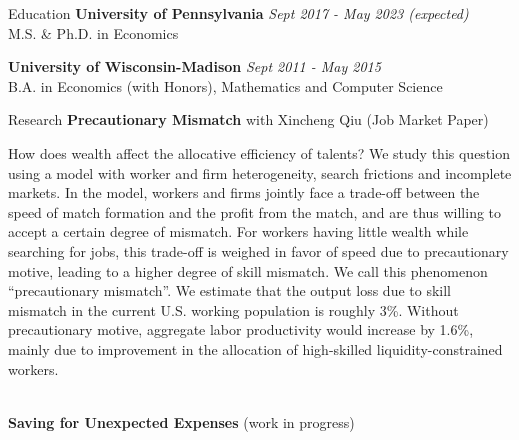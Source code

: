 \documentclass{resume}
\begin{document}
\begin{rSection}{Education}
{\bf University of Pennsylvania} \hfill {\em Sept 2017 - May 2023 (expected)}
\\M.S. \& Ph.D. in Economics 

{\bf University of Wisconsin-Madison} \hfill {\em Sept 2011 - May 2015} 
\\B.A. in Economics (with Honors), Mathematics and Computer Science

\end{rSection}

\begin{rSection}{Research}
\textbf{Precautionary Mismatch} with Xincheng Qiu (Job Market Paper)  \\
\begin{small}
How does wealth affect the allocative efficiency of talents? We study this question using a model with worker and firm heterogeneity, search frictions and incomplete markets. In the model, workers and firms jointly face a trade-off between the speed of match formation and the profit from the match, and are thus willing to accept a certain degree of mismatch. For workers having little wealth while searching for jobs, this trade-off is weighed in favor of speed due to precautionary motive, leading to a higher degree of skill mismatch. We call this phenomenon ``precautionary mismatch''. We estimate that the output loss due to skill mismatch in the current U.S. working population is roughly 3\%. Without precautionary motive, aggregate labor productivity would increase by 1.6\%, mainly due to improvement in the allocation of high-skilled liquidity-constrained workers. 
\end{small} 
\vspace{5pt}
\\
\textbf{Saving for Unexpected Expenses} (work in progress)
\end{rSection}
\end{document}
